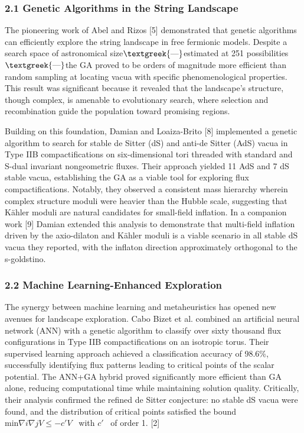 \documentclass{article}
\begin{document}
\subsubsection{2.1 Genetic Algorithms in the String Landscape}
The pioneering work of Abel and Rizos [5] demonstrated that genetic algorithms can efficiently explore the string
landscape in free fermionic models. Despite a search space of astronomical size$\text{\textgreek{—}}$estimated at 251
possibilities$\text{\textgreek{—}}$the GA proved to be orders of magnitude more efficient than random sampling at
locating vacua with specific phenomenological properties. This result was significant because it revealed that the
landscape's structure, though complex, is amenable to evolutionary search, where selection and recombination guide the
population toward promising regions.

Building on this foundation, Damian and Loaiza-Brito [8] implemented a genetic algorithm to search for stable de Sitter
(dS) and anti-de Sitter (AdS) vacua in Type IIB compactifications on six-dimensional tori threaded with standard and
S-dual invariant nongeometric fluxes. Their approach yielded 11 AdS and 7 dS stable vacua, establishing the GA as a
viable tool for exploring flux compactifications. Notably, they observed a consistent mass hierarchy wherein complex
structure moduli were heavier than the Hubble scale, suggesting that Kähler moduli are natural candidates for
small-field inflation. In a companion work [9] Damian extended this analysis to demonstrate that multi-field inflation
driven by the axio-dilaton and Kähler moduli is a viable scenario in all stable dS vacua they reported, with the
inflaton direction approximately orthogonal to the s-goldstino.

\subsubsection[2.2 Machine Learning{}-Enhanced Exploration]{2.2 Machine Learning-Enhanced Exploration}
The synergy between machine learning and metaheuristics has opened new avenues for landscape exploration. Cabo Bizet et
al. combined an artificial neural network (ANN) with a genetic algorithm to classify over sixty thousand flux
configurations in Type IIB compactifications on an isotropic torus. Their supervised learning approach achieved a
classification accuracy of 98.6\%, successfully identifying flux patterns leading to critical points of the scalar
potential. The ANN+GA hybrid proved significantly more efficient than GA alone, reducing computational time while
maintaining solution quality. Critically, their analysis confirmed the refined de Sitter conjecture: no stable dS vacua
were found, and the distribution of critical points satisfied the bound  $\text{min}\nabla i\nabla jV\le -c'V$ \ with 
$c'$ \ of order 1. [2]
\end{document}
